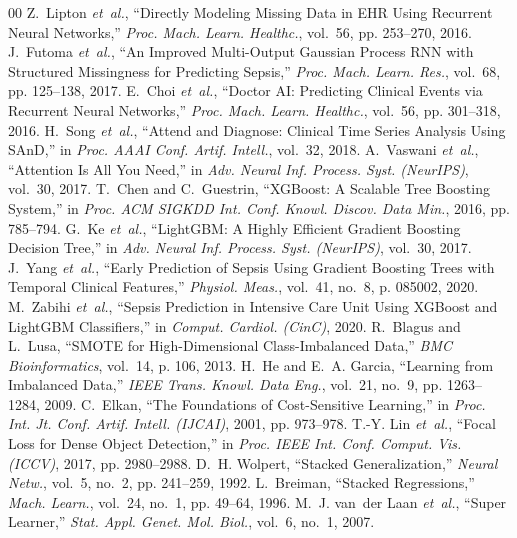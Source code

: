 \documentclass[conference]{IEEEtran}
\begin{document}
{\begin{thebibliography}{00}
Z.~Lipton \emph{et~al.}, ``Directly Modeling Missing Data in EHR Using Recurrent Neural Networks,'' \emph{Proc. Mach. Learn. Healthc.}, vol.~56, pp. 253--270, 2016.
J.~Futoma \emph{et~al.}, ``An Improved Multi-Output Gaussian Process RNN with Structured Missingness for Predicting Sepsis,'' \emph{Proc. Mach. Learn. Res.}, vol.~68, pp. 125--138, 2017.
E.~Choi \emph{et~al.}, ``Doctor AI: Predicting Clinical Events via Recurrent Neural Networks,'' \emph{Proc. Mach. Learn. Healthc.}, vol.~56, pp. 301--318, 2016.
H.~Song \emph{et~al.}, ``Attend and Diagnose: Clinical Time Series Analysis Using SAnD,'' in \emph{Proc. AAAI Conf. Artif. Intell.}, vol.~32, 2018.
A.~Vaswani \emph{et~al.}, ``Attention Is All You Need,'' in \emph{Adv. Neural Inf. Process. Syst. (NeurIPS)}, vol.~30, 2017.
T.~Chen and C.~Guestrin, ``XGBoost: A Scalable Tree Boosting System,'' in \emph{Proc. ACM SIGKDD Int. Conf. Knowl. Discov. Data Min.}, 2016, pp. 785--794.
G.~Ke \emph{et~al.}, ``LightGBM: A Highly Efficient Gradient Boosting Decision Tree,'' in \emph{Adv. Neural Inf. Process. Syst. (NeurIPS)}, vol.~30, 2017.
J.~Yang \emph{et~al.}, ``Early Prediction of Sepsis Using Gradient Boosting Trees with Temporal Clinical Features,'' \emph{Physiol. Meas.}, vol.~41, no.~8, p. 085002, 2020.
M.~Zabihi \emph{et~al.}, ``Sepsis Prediction in Intensive Care Unit Using XGBoost and LightGBM Classifiers,'' in \emph{Comput. Cardiol. (CinC)}, 2020.
R.~Blagus and L.~Lusa, ``SMOTE for High-Dimensional Class-Imbalanced Data,'' \emph{BMC Bioinformatics}, vol.~14, p. 106, 2013.
H.~He and E.~A. Garcia, ``Learning from Imbalanced Data,'' \emph{IEEE Trans. Knowl. Data Eng.}, vol.~21, no.~9, pp. 1263--1284, 2009.
C.~Elkan, ``The Foundations of Cost-Sensitive Learning,'' in \emph{Proc. Int. Jt. Conf. Artif. Intell. (IJCAI)}, 2001, pp. 973--978.
T.-Y. Lin \emph{et~al.}, ``Focal Loss for Dense Object Detection,'' in \emph{Proc. IEEE Int. Conf. Comput. Vis. (ICCV)}, 2017, pp. 2980--2988.
D.~H. Wolpert, ``Stacked Generalization,'' \emph{Neural Netw.}, vol.~5, no.~2, pp. 241--259, 1992.
L.~Breiman, ``Stacked Regressions,'' \emph{Mach. Learn.}, vol.~24, no.~1, pp. 49--64, 1996.
M.~J. van~der Laan \emph{et~al.}, ``Super Learner,'' \emph{Stat. Appl. Genet. Mol. Biol.}, vol.~6, no.~1, 2007.

\end{thebibliography}}
\end{document}
